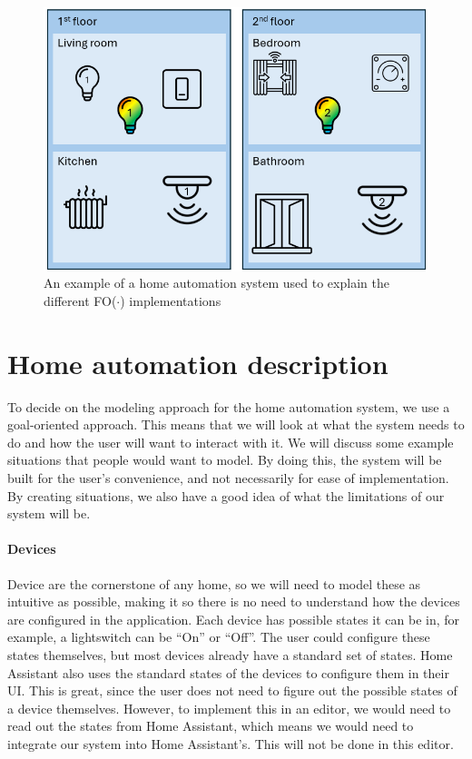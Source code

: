 \documentclass[11pt,a4paper]{report}
\newcommand{\fodot}{FO($\cdot$)\xspace}
\begin{document}
\begin{figure}
    \centering
    \includegraphics[width=0.8\linewidth]{images/fodot-structure_example.png}
    \caption{An example of a home automation system used to explain the different \fodot implementations}
    \label{fig:fodot-structure_example}
\end{figure}

\section{Home automation description}
To decide on the modeling approach for the home automation system, we use a goal-oriented approach. This means that we will look at what the system needs to do and how the user will want to interact with it. We will discuss some example situations that people would want to model. By doing this, the system will be built for the user's convenience, and not necessarily for ease of implementation. By creating situations, we also have a good idea of what the limitations of our system will be.

\paragraph{Devices}
Device are the cornerstone of any home, so we will need to model these as intuitive as possible, making it so there is no need to understand how the devices are configured in the application. Each device has possible states it can be in, for example, a lightswitch can be ``On'' or ``Off''. The user could configure these states themselves, but most devices already have a standard set of states. Home Assistant also uses the standard states of the devices to configure them in their UI. This is great, since the user does not need to figure out the possible states of a device themselves. However, to implement this in an editor, we would need to read out the states from Home Assistant, which means we would need to integrate our system into Home Assistant's. This will not be done in this editor.
\end{document}
